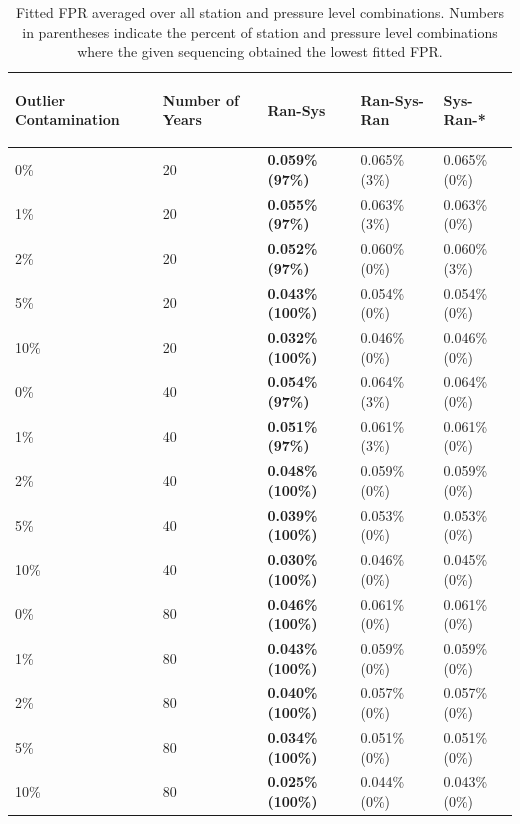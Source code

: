 \documentclass[12pt]{article}
\begin{document}
\begin{table}[ht]
\centering
\begin{tabular}{lllll}
  \hline
\begin{sideways} Outlier Contamination \end{sideways} & \begin{sideways} Number of Years \end{sideways} & \begin{sideways} Ran-Sys \end{sideways} & \begin{sideways} Ran-Sys-Ran \end{sideways} & \begin{sideways} Sys-Ran-* \end{sideways} \\ 
  \hline
0\% & 20 & \textbf{0.059\% (97\%)} & 0.065\% (3\%) & 0.065\% (0\%) \\ 
  1\% & 20 & \textbf{0.055\% (97\%)} & 0.063\% (3\%) & 0.063\% (0\%) \\ 
  2\% & 20 & \textbf{0.052\% (97\%)} & 0.060\% (0\%) & 0.060\% (3\%) \\ 
  5\% & 20 & \textbf{0.043\% (100\%)} & 0.054\% (0\%) & 0.054\% (0\%) \\ 
  10\% & 20 & \textbf{0.032\% (100\%)} & 0.046\% (0\%) & 0.046\% (0\%) \\ 
  0\% & 40 & \textbf{0.054\% (97\%)} & 0.064\% (3\%) & 0.064\% (0\%) \\ 
  1\% & 40 & \textbf{0.051\% (97\%)} & 0.061\% (3\%) & 0.061\% (0\%) \\ 
  2\% & 40 & \textbf{0.048\% (100\%)} & 0.059\% (0\%) & 0.059\% (0\%) \\ 
  5\% & 40 & \textbf{0.039\% (100\%)} & 0.053\% (0\%) & 0.053\% (0\%) \\ 
  10\% & 40 & \textbf{0.030\% (100\%)} & 0.046\% (0\%) & 0.045\% (0\%) \\ 
  0\% & 80 & \textbf{0.046\% (100\%)} & 0.061\% (0\%) & 0.061\% (0\%) \\ 
  1\% & 80 & \textbf{0.043\% (100\%)} & 0.059\% (0\%) & 0.059\% (0\%) \\ 
  2\% & 80 & \textbf{0.040\% (100\%)} & 0.057\% (0\%) & 0.057\% (0\%) \\ 
  5\% & 80 & \textbf{0.034\% (100\%)} & 0.051\% (0\%) & 0.051\% (0\%) \\ 
  10\% & 80 & \textbf{0.025\% (100\%)} & 0.044\% (0\%) & 0.043\% (0\%) \\ 
   \hline
\end{tabular}
	\caption{Fitted FPR averaged over all station and pressure level combinations.  Numbers in parentheses indicate the percent of station and pressure level combinations where the given sequencing obtained the lowest fitted FPR.}
	\label{tab:fitFPR}
\end{table}
\end{document}
